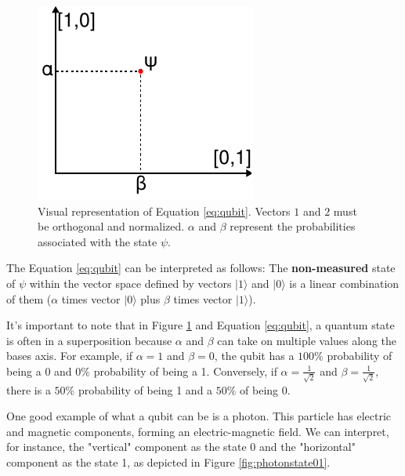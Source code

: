 		\begin{figure}[h]
			\centering
			\includegraphics{images/qubitPlot}
			\caption{Visual representation of Equation \ref{eq:qubit}. Vectors $1$ and $2$ must be orthogonal and normalized. $\alpha$ and $\beta$ represent the probabilities associated with the state $\psi$.}
			\label{fig:qubitplot}
		\end{figure}
		
		\par The Equation \ref{eq:qubit} can be interpreted as follows: The \textbf{non-measured} state of $\psi$ within the vector space defined by vectors $| 1 \rangle$ and $| 0 \rangle$ is a linear combination of them  ($\alpha$ times vector $| 0 \rangle$ plus $\beta$ times vector $| 1 \rangle$).\newline
		
		\par It's important to note that in Figure \ref{fig:qubitplot} and Equation \ref{eq:qubit}, a quantum state is often in a superposition because $\alpha$ and $\beta$ can take on multiple values along the bases axis. For example, if $\alpha = 1$ and $\beta = 0$, the qubit has a $100\%$ probability of being a 0 and $0\%$ probability of being a 1. Conversely, if $\alpha = \frac{1}{\sqrt{2}}$ and $\beta = \frac{1}{\sqrt{2}}$, there is a $50\%$ probability of being 1 and a $50\%$ of being 0.\newline
		
		\par One good example of what a qubit can be is a photon. This particle has electric and magnetic components, forming an electric-magnetic field. We can interpret, for instance, the "vertical" component as the state 0 and the "horizontal" component as the state 1, as depicted in Figure \ref{fig:photonstate01}.
		
